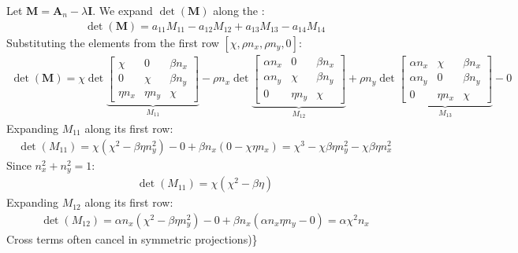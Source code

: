 \documentclass[letterpaper,10pt,english]{jupyterBook}
\begin{document}
\sphinxAtStartPar
Let \(\mathbf{M} = \mathbf{A}_n - \lambda \mathbf{I}\). We expand \(\det(\mathbf{M})\) along the :
\begin{equation*}
\begin{split}
\det(\mathbf{M}) = a_{11}M_{11} - a_{12}M_{12} + a_{13}M_{13} - a_{14}M_{14}
\end{split}
\end{equation*}
\sphinxAtStartPar
{}
Substituting the elements from the first row \([\chi, \rho n_x, \rho n_y, 0]\):
\begin{equation*}
\begin{split}
\det(\mathbf{M}) = \chi \det \underbrace{\begin{bmatrix} \chi & 0 & \beta n_x \\ 0 & \chi & \beta n_y \\ \eta n_x & \eta n_y & \chi \end{bmatrix}}_{M_{11}} - \rho n_x \det \underbrace{\begin{bmatrix} \alpha n_x & 0 & \beta n_x \\ \alpha n_y & \chi & \beta n_y \\ 0 & \eta n_y & \chi \end{bmatrix}}_{M_{12}} + \rho n_y \det \underbrace{\begin{bmatrix} \alpha n_x & \chi & \beta n_x \\ \alpha n_y & 0 & \beta n_y \\ 0 & \eta n_x & \chi \end{bmatrix}}_{M_{13}} - 0
\end{split}
\end{equation*}
\sphinxAtStartPar
{}
Expanding \(M_{11}\) along its first row:
\begin{equation*}
\begin{split}
\det(M_{11}) = \chi(\chi^2 - \beta \eta n_y^2) - 0 + \beta n_x(0 - \chi \eta n_x) = \chi^3 - \chi \beta \eta n_y^2 - \chi \beta \eta n_x^2
\end{split}
\end{equation*}
\sphinxAtStartPar
Since \(n_x^2 + n_y^2 = 1\):
\begin{equation*}
\begin{split} \det(M_{11}) = \chi(\chi^2 - \beta \eta) \end{split}
\end{equation*}
\sphinxAtStartPar
{}
Expanding \(M_{12}\) along its first row:
\begin{equation*}
\begin{split}
\det(M_{12}) = \alpha n_x(\chi^2 - \beta \eta n_y^2) - 0 + \beta n_x(\alpha n_x \eta n_y - 0) =  \alpha \chi^2 n_x
\end{split}
\end{equation*}
\sphinxAtStartPar
{} Cross terms often cancel in symmetric projections)\}
\end{document}
